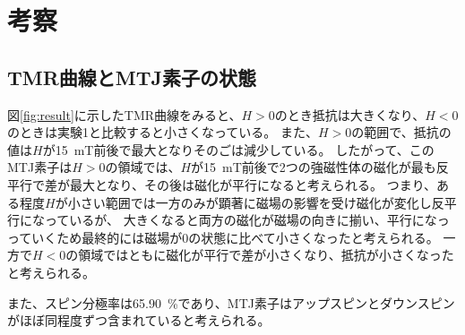 \documentclass[../../../main]{subfiles}
\begin{document}
\section{考察}

\subsection{TMR曲線とMTJ素子の状態}
図\ref{fig:result}に示したTMR曲線をみると、$H>0$のとき抵抗は大きくなり、$H<0$のときは実験1と比較すると小さくなっている。
また、$H>0$の範囲で、抵抗の値は$H$が\SI{15}{mT}前後で最大となりそのごは減少している。
したがって、このMTJ素子は$H>0$の領域では、$H$が\SI{15}{mT}前後で2つの強磁性体の磁化が最も反平行で差が最大となり、その後は磁化が平行になると考えられる。
つまり、ある程度$H$が小さい範囲では一方のみが顕著に磁場の影響を受け磁化が変化し反平行になっているが、
大きくなると両方の磁化が磁場の向きに揃い、平行になっっていくため最終的には磁場が0の状態に比べて小さくなったと考えられる。
一方で$H<0$の領域ではともに磁化が平行で差が小さくなり、抵抗が小さくなったと考えられる。

また、スピン分極率は\SI{65.90}{\%}であり、MTJ素子はアップスピンとダウンスピンがほぼ同程度ずつ含まれていると考えられる。
\end{document}
